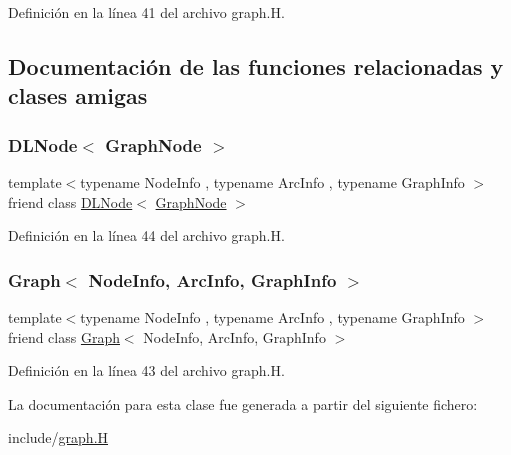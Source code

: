 Definición en la línea 41 del archivo graph.\+H.



\subsection{Documentación de las funciones relacionadas y clases amigas}
\mbox{\label{class_designar_1_1_graph_node_a5d0e7b51039a0eb5cfdfdb2f3701f06d}} 
\subsubsection{\texorpdfstring{D\+L\+Node$<$ Graph\+Node $>$}{DLNode< GraphNode >}}
{\footnotesize\ttfamily template$<$typename Node\+Info , typename Arc\+Info , typename Graph\+Info $>$ \\
friend class \hyperlink{class_designar_1_1_d_l_node}{D\+L\+Node}$<$ \hyperlink{class_designar_1_1_graph_node}{Graph\+Node} $>$\hspace{0.3cm}{\ttfamily [friend]}}



Definición en la línea 44 del archivo graph.\+H.

\mbox{\label{class_designar_1_1_graph_node_a0a9834688687d864501bbb9c85b0d32c}} 
\subsubsection{\texorpdfstring{Graph$<$ Node\+Info, Arc\+Info, Graph\+Info $>$}{Graph< NodeInfo, ArcInfo, GraphInfo >}}
{\footnotesize\ttfamily template$<$typename Node\+Info , typename Arc\+Info , typename Graph\+Info $>$ \\
friend class \hyperlink{class_designar_1_1_graph}{Graph}$<$ Node\+Info, Arc\+Info, Graph\+Info $>$\hspace{0.3cm}{\ttfamily [friend]}}



Definición en la línea 43 del archivo graph.\+H.



La documentación para esta clase fue generada a partir del siguiente fichero\+:\begin{DoxyCompactItemize}
\item 
include/\hyperlink{graph_8_h}{graph.\+H}\end{DoxyCompactItemize}
